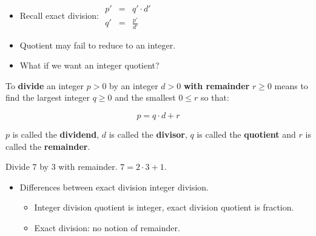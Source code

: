 \begin{frame}
\vskip -0.06cm
\begin{itemize}
\item Recall exact division: 
$
\begin{array}{rcl}
p'&=&q'\cdot d'\\
q'&=&\frac{p'}{d'}
\end{array}
$
\item Quotient may fail to reduce to an integer.
\item What if we want an integer quotient?
\end{itemize}
\vskip -0.05cm
\begin{definition}
To \textbf{divide} an integer $p >0$ by an integer $d > 0$  \textbf{with remainder} $r \geq 0$ means to find the largest integer $q \geq 0$ and the smallest $0\leq r$ so that:

\vskip -0.2cm
\[
p = q\cdot d+ r
\]
\vskip -0.01cm

$p$ is called the \textbf{dividend}, $d$ is called the \textbf{divisor}, $q$ is called the \textbf{quotient} and $r$ is called the \textbf{remainder}.
\end{definition}
\vskip -0.06cm
\begin{example}
Divide $7 $ by $3$ with remainder. $7 = 2\cdot 3 +1 $.
\end{example}
\vskip -0.06cm
\begin{itemize}
\item Differences between exact division integer division.
\begin{itemize}
\item Integer division quotient is integer, exact division quotient is fraction.
\item Exact division: no notion of remainder.
\end{itemize}
\end{itemize}


\end{frame}